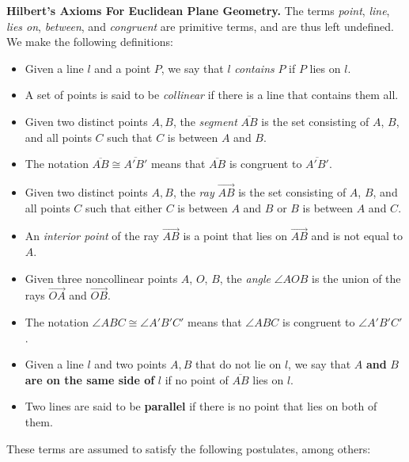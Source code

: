 \textbf{Hilbert's Axioms For Euclidean Plane Geometry.} The terms \emph{point}, \emph{line}, \emph{lies on}, \emph{between}, and \emph{congruent} are primitive terms, and are thus left undefined. We make the following definitions:

\begin{itemize}
\item Given a line $l$ and a point $P$, we say that $l$ \emph{contains} $P$ if $P$ lies on $l$.
\item A set of points is said to be \emph{collinear} if there is a line that contains them all.
\item Given two distinct points $A, B$, the \emph{segment} $\overline{AB}$ is the set consisting of $A$, $B$, and all points $C$ such that $C$ is between $A$ and $B$.
\item The notation $\overline{AB} \cong \overline{A'B'}$ means that $\overline{AB}$ is congruent to $\overline{A'B'}$.
\item Given two distinct points $A, B$, the \emph{ray} $\overrightarrow{AB}$ is the set consisting of $A$, $B$, and all points $C$ such that either $C$ is between $A$ and $B$ or $B$ is between $A$ and $C$.
\item An \emph{interior point} of the ray $\overrightarrow{AB}$ is a point that lies on $\overrightarrow{AB}$ and is not equal to $A$.
\item Given three noncollinear points $A$, $O$, $B$, the \emph{angle} $\angle AOB$ is the union of the rays $\overrightarrow{OA}$ and $\overrightarrow{OB}$.
\item The notation $\angle ABC \cong \angle A'B'C'$ means that $\angle ABC$ is congruent to $\angle A'B'C'$.
\item Given a line $l$ and two points $A, B$ that do not lie on $l$, we say that $A$ \textbf{and} $B$ \textbf{are on the same side of} $l$ if no point of $\overline{AB}$ lies on $l$.
\item Two lines are said to be \textbf{parallel} if there is no point that lies on both of them.
\end{itemize}

These terms are assumed to satisfy the following postulates, among others:

